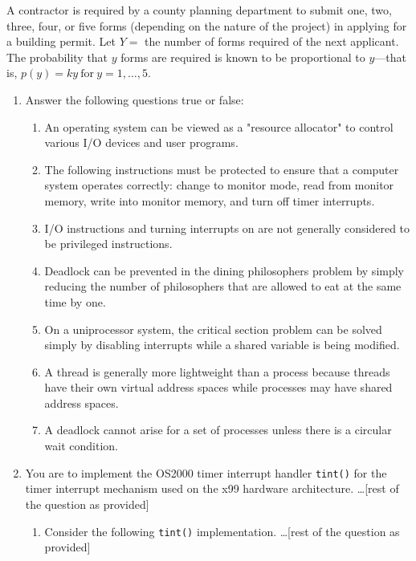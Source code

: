 \documentclass[letterpaper,12pt,addpoints]{exam}
\begin{document}
\clearpage
\begin{questions}
\question
A contractor is required by a county planning department to submit one, two, three, four, or five forms (depending on the nature of the project) in applying for a building permit. Let $Y=$ the number of forms required of the next applicant. The probability that $y$ forms are required is known to be proportional to $y$---that is, $p(y)=ky\ \text{for}\ y=1,\dots,5.$

\begin{parts}
    \begin{enumerate}
        \item Answer the following questions true or false:
        \begin{enumerate}[label=\alph*.]
            \item An operating system can be viewed as a "resource allocator" to control various I/O devices and user programs.
            \item The following instructions must be protected to ensure that a computer system operates correctly: change to monitor mode, read from monitor memory, write into monitor memory, and turn off timer interrupts.
            \item I/O instructions and turning interrupts on are not generally considered to be privileged instructions.
            \item Deadlock can be prevented in the dining philosophers problem by simply reducing the number of philosophers that are allowed to eat at the same time by one.
            \item On a uniprocessor system, the critical section problem can be solved simply by disabling interrupts while a shared variable is being modified.
            \item A thread is generally more lightweight than a process because threads have their own virtual address spaces while processes may have shared address spaces.
            \item A deadlock cannot arise for a set of processes unless there is a circular wait condition.
        \end{enumerate}
        \item You are to implement the OS2000 timer interrupt handler \texttt{tint()} for the timer interrupt mechanism used on the x99 hardware architecture. \ldots [rest of the question as provided]
        \begin{enumerate}[label=\alph*.]
            \item Consider the following \texttt{tint()} implementation. \ldots [rest of the question as provided]

\end{enumerate}
\end{enumerate}
\end{parts}
\end{questions}
\end{document}
